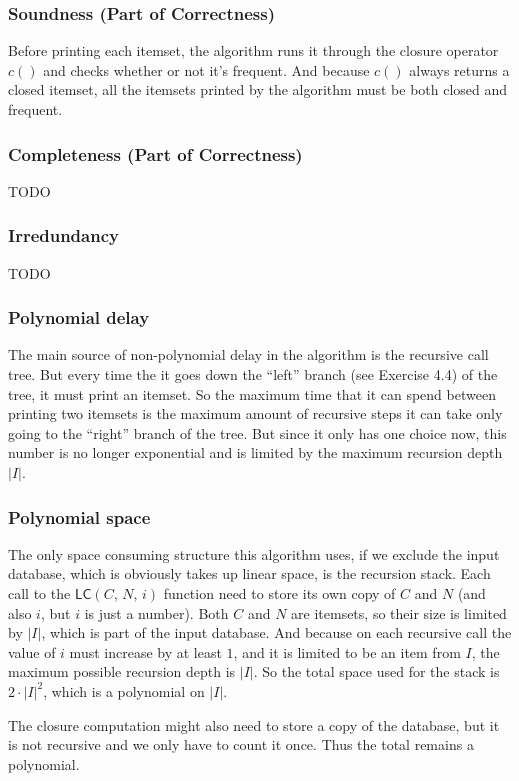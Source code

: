 \documentclass{article}
\newcommand{\LC}[3]{\mathsf{LC}(#1,\, #2,\, #3)}
\begin{document}
  \subsubsection{Soundness (Part of Correctness)}
  Before printing each itemset, the algorithm runs it through the closure operator $c()$ and checks whether or not it's frequent.
  And because $c()$ always returns a closed itemset, all the itemsets printed by the algorithm must be both closed and frequent.

  \subsubsection{Completeness (Part of Correctness)}
  TODO
  \subsubsection{Irredundancy}
  TODO
  \subsubsection{Polynomial delay}
  The main source of non-polynomial delay in the algorithm is the recursive call tree.
  But every time the it goes down the ``left'' branch (see Exercise 4.4) of the tree, it must print an itemset.
  So the maximum time that it can spend between printing two itemsets is the maximum amount of recursive steps it can take only going to the ``right'' branch of the tree.
  But since it only has one choice now, this number is no longer exponential and is limited by the maximum recursion depth $|I|$.

  \subsubsection{Polynomial space}
  The only space consuming structure this algorithm uses, if we exclude the input database, which is obviously takes up linear space,
  is the recursion stack.
  Each call to the $\LC{C}{N}{i}$ function need to store its own copy of $C$ and $N$ (and also $i$, but $i$ is just a number).
  Both $C$ and $N$ are itemsets, so their size is limited by $|I|$, which is part of the input database.
  And because on each recursive call the value of $i$ must increase by at least $1$, and it is limited to be an item from $I$,
  the maximum possible recursion depth is $|I|$.
  So the total space used for the stack is $2 \cdot |I|^2$, which is a polynomial on $|I|$.

  The closure computation might also need to store a copy of the database, but it is not recursive and we only have to count it once.
  Thus the total remains a polynomial.
\end{document}
